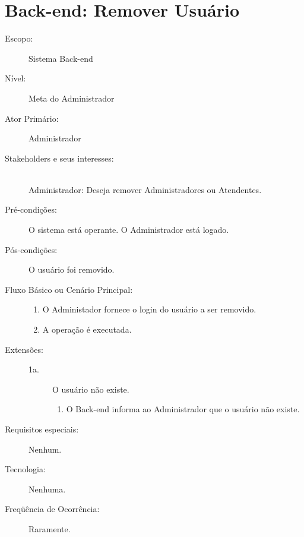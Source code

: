 \documentclass[brazil,times]{abnt}
\begin{document}
\section{Back-end: Remover Usuário}
\begin{description}
\item[Escopo:] Sistema Back-end
\item[Nível:] Meta do Administrador
\item[Ator Primário:] Administrador
\item[Stakeholders e seus interesses:] \hfill \\
Administrador: Deseja remover Administradores ou Atendentes.

\item[Pré-condições:] O sistema está operante. O Administrador está logado.
\item[Pós-condições:] O usuário foi removido.
\item[Fluxo Básico ou Cenário Principal:]\hfill
\begin{enumerate}
  \item O Administador fornece o login do usuário a ser removido.
  \item A operação é executada.
\end{enumerate}

\item[Extensões:]\hfill
\begin{description}
	\item[1a.] O usuário não existe.
	\begin{enumerate}
 		\item O Back-end informa ao Administrador que o usuário não existe.
	\end{enumerate}

\end{description}
\item[Requisitos especiais:] Nenhum.
\item[Tecnologia:] Nenhuma.
\item[Freqüência de Ocorrência:] Raramente.

\end{description}
\end{document}

